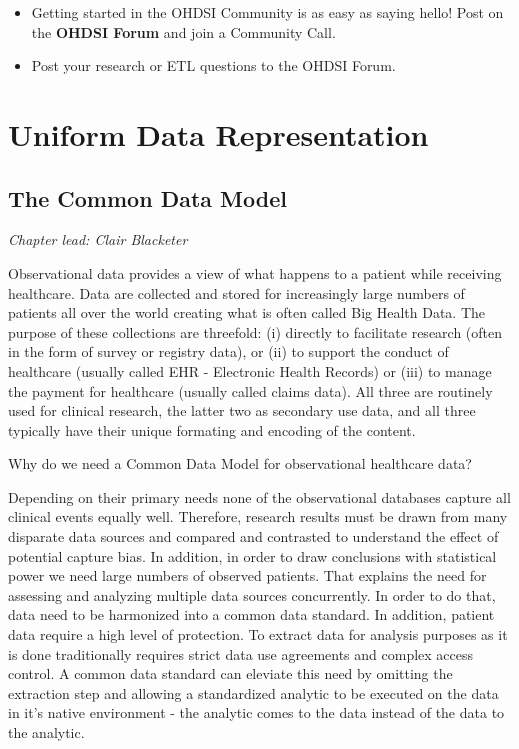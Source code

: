 \documentclass[11pt]{book}
\providecommand{\tightlist}{%
  \setlength{\itemsep}{0pt}\setlength{\parskip}{0pt}}
\theoremstyle{definition}
\theoremstyle{definition}
\theoremstyle{definition}
\theoremstyle{remark}
\let\BeginKnitrBlock\begin \let\EndKnitrBlock\end
\begin{document}
\BeginKnitrBlock{rmdsummary}
\begin{itemize}
\tightlist
\item
  Getting started in the OHDSI Community is as easy as saying hello! Post on the \textbf{OHDSI Forum} and join a Community Call.
\item
  Post your research or ETL questions to the OHDSI Forum.
\end{itemize}
\EndKnitrBlock{rmdsummary}

\hypertarget{part-uniform-data-representation}{%
\part{Uniform Data Representation}\label{part-uniform-data-representation}}

\hypertarget{CommonDataModel}{%
\chapter{The Common Data Model}\label{CommonDataModel}}

\emph{Chapter lead: Clair Blacketer}

Observational data provides a view of what happens to a patient while receiving healthcare. Data are collected and stored for increasingly large numbers of patients all over the world creating what is often called Big Health Data. The purpose of these collections are threefold: (i) directly to facilitate research (often in the form of survey or registry data), or (ii) to support the conduct of healthcare (usually called EHR - Electronic Health Records) or (iii) to manage the payment for healthcare (usually called claims data). All three are routinely used for clinical research, the latter two as secondary use data, and all three typically have their unique formating and encoding of the content.   

Why do we need a Common Data Model for observational healthcare data?

Depending on their primary needs none of the observational databases capture all clinical events equally well. Therefore, research results must be drawn from many disparate data sources and compared and contrasted to understand the effect of potential capture bias. In addition, in order to draw conclusions with statistical power we need large numbers of observed patients. That explains the need for assessing and analyzing multiple data sources concurrently. In order to do that, data need to be harmonized into a common data standard. In addition, patient data require a high level of protection. To extract data for analysis purposes as it is done traditionally requires strict data use agreements and complex access control. A common data standard can eleviate this need by omitting the extraction step and allowing a standardized analytic to be executed on the data in it's native environment - the analytic comes to the data instead of the data to the analytic.
\end{document}
